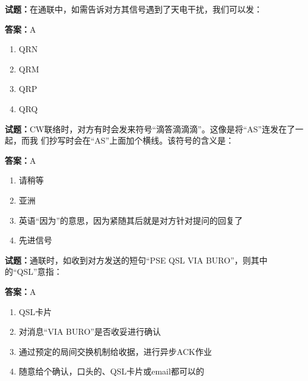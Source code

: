 \documentclass{ctexbook}
\begin{document}




\vspace{1em}

\textbf{试题：}在通联中，如需告诉对方其信号遇到了天电干扰，我们可以发： 

\textbf{答案：}A 

\begin{enumerate}[leftmargin=3em]
  \item QRN 

  \item QRM 

  \item QRP 

  \item QRQ 

\end{enumerate}





\vspace{1em}

\textbf{试题：}CW联络时，对方有时会发来符号“滴答滴滴滴”。这像是将“AS”连发在了一起，而我
们抄写时会在“AS”上面加个横线。该符号的含义是： 

\textbf{答案：}A 

\begin{enumerate}[leftmargin=3em]
  \item 请稍等 

  \item 亚洲 

  \item 英语“因为”的意思，因为紧随其后就是对方针对提问的回复了 

  \item 先进信号 

\end{enumerate}





\vspace{1em}

\textbf{试题：}通联时，如收到对方发送的短句“PSE QSL VIA BURO”，则其中的“QSL”意指： 

\textbf{答案：}A 

\begin{enumerate}[leftmargin=3em]
  \item QSL卡片 

  \item 对消息“VIA BURO”是否收妥进行确认 

  \item 通过预定的局间交换机制给收据，进行异步ACK作业 

  \item 随意给个确认，口头的、QSL卡片或email都可以的 


\end{enumerate}
\end{document}
